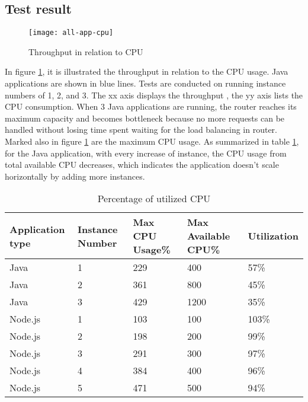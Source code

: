 \subsection{Test result}
 \begin{figure}[h]
	\centering
	\texttt{[image: all-app-cpu]}
	\caption{Throughput in relation to CPU}
	\label{all-app-cpu}
\end{figure}
In figure \ref{all-app-cpu}, it is illustrated the throughput in relation to the CPU usage. Java applications are shown in blue lines. Tests are conducted on running instance numbers of 1, 2, and 3. The xx axis displays the throughput , the yy axis lists the CPU consumption. When 3 Java applications are running, the router reaches its maximum capacity and becomes bottleneck because no more requests can be handled without losing time spent waiting for the load balancing in router. Marked also in figure \ref{all-app-cpu} are the maximum CPU usage. As summarized in table \ref{app-cpu-usage}, for the Java application, with every increase of instance, the CPU usage from total available CPU decreases, which indicates the application doesn't scale horizontally by adding more instances. 
\begin{table}[h]
	\caption{Percentage of utilized CPU}
	\label{app-cpu-usage}
	\renewcommand{\arraystretch}{1.2}
	\centering
	\sffamily
	\begin{footnotesize}
		\begin{tabular}{l l l l l  }
			\toprule
			\textbf{Application  type} &\textbf{Instance Number} & \textbf{Max CPU Usage\%} & \textbf{Max Available CPU\%}& \textbf{Utilization} }\\
		\midrule
		Java &1 	&	229	 & 400 & 57\% \\
		Java &2	&	361 & 800& 45\% \\
		Java &3	&	429  &	1200 & 35\%\\
				\midrule
			Node.js &1 	&	103	 & 100 & 103\% \\
		Node.js &2	&	198 &  200& 99\% \\
		Node.js &3	&	291 & 300 & 97\%\\
		Node.js &4	&	384 & 400 & 96\%\\
		Node.js &5	&	471 & 500 & 94\%\\
		\bottomrule
	\end{tabular}
\end{footnotesize}
\rmfamily
\end{table}

